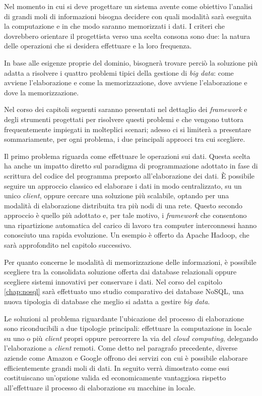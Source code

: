 Nel momento in cui si deve progettare un sistema avente come obiettivo l’analisi di grandi moli di informazioni bisogna decidere con quali modalità sarà eseguita la computazione 
e in che modo saranno memorizzati i dati. I criteri che dovrebbero orientare il progettista verso una scelta consona sono due: la natura delle operazioni che si desidera effettuare 
e la loro frequenza.

In base alle esigenze proprie del dominio, bisognerà trovare perciò la soluzione più adatta a risolvere i quattro problemi tipici della gestione di \textit{big data}: come avviene 
l’elaborazione e come la memorizzazione, dove avviene l’elaborazione e dove la memorizzazione.

Nel corso dei capitoli seguenti saranno presentati nel dettaglio dei \textit{framework} e degli strumenti progettati per risolvere questi problemi e che vengono tuttora frequentemente
impiegati in molteplici scenari; adesso ci si limiterà a presentare sommariamente, per ogni problema, i due principali approcci tra cui scegliere.

Il primo problema riguarda come effettuare le operazioni sui dati. Questa scelta ha anche un impatto diretto sul paradigma di programmazione adottato in fase di scrittura 
del codice del programma preposto all’elaborazione dei dati. È possibile seguire un approccio classico ed elaborare i dati in modo centralizzato, su un unico \textit{client}, 
oppure cercare una soluzione più scalabile, optando per una modalità di elaborazione distribuita tra più nodi di una rete. Questo secondo approccio è quello più adottato
e, per tale motivo, i \textit{framework} che consentono una ripartizione automatica del carico di lavoro tra computer interconnessi hanno conosciuto una rapida evoluzione. Un esempio
è offerto da Apache Hadoop, che sarà approfondito nel capitolo successivo.

Per quanto concerne le modalità di memorizzazione delle informazioni, è possibile scegliere tra la consolidata soluzione offerta dai database relazionali oppure scegliere 
sistemi innovativi per conservare i dati. Nel corso del capitolo \ref{chap:nosql} sarà effettuato uno studio comparativo dei database NoSQL, una nuova tipologia di database che meglio si 
adatta a gestire \textit{big data}.

Le soluzioni al problema riguardante l’ubicazione del processo di elaborazione sono riconducibili a due tipologie principali: effettuare la computazione in locale su uno o
più \textit{client} propri oppure percorrere la via del \textit{cloud computing}, delegando l’elaborazione a \textit{client} remoti. Come detto nel paragrafo precedente, diverse aziende come Amazon e
Google offrono dei servizi con cui è possibile elaborare efficientemente grandi moli di dati. In seguito verrà dimostrato come essi costituiscano un’opzione valida ed 
economicamente vantaggiosa rispetto all’effettuare il processo di elaborazione su macchine in locale.

